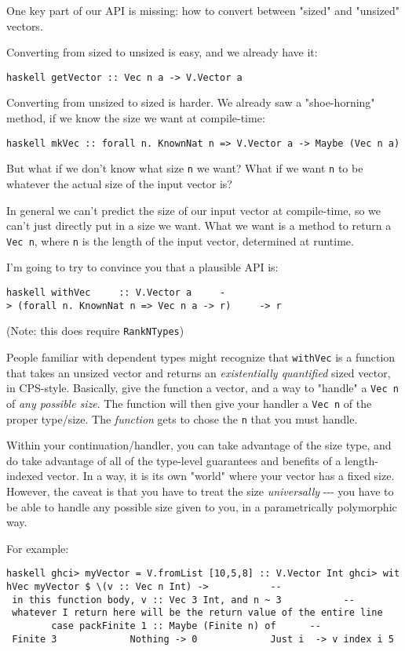 \documentclass[]{article}
\begin{document}
One key part of our API is missing: how to convert between "sized" and "unsized"
vectors.

Converting from sized to unsized is easy, and we already have it:

\texttt{haskell\ getVector\ ::\ Vec\ n\ a\ -\textgreater{}\ V.Vector\ a}

Converting from unsized to sized is harder. We already saw a "shoe-horning"
method, if we know the size we want at compile-time:

\texttt{haskell\ mkVec\ ::\ forall\ n.\ KnownNat\ n\ =\textgreater{}\ V.Vector\ a\ -\textgreater{}\ Maybe\ (Vec\ n\ a)}

But what if we don't know what size \texttt{n} we want? What if we want
\texttt{n} to be whatever the actual size of the input vector is?

In general we can't predict the size of our input vector at compile-time, so we
can't just directly put in a size we want. What we want is a method to return a
\texttt{Vec\ n}, where \texttt{n} is the length of the input vector, determined
at runtime.

I'm going to try to convince you that a plausible API is:

\texttt{haskell\ withVec\ \ \ \ \ ::\ V.Vector\ a\ \ \ \ \ -\textgreater{}\ (forall\ n.\ KnownNat\ n\ =\textgreater{}\ Vec\ n\ a\ -\textgreater{}\ r)\ \ \ \ \ -\textgreater{}\ r}

(Note: this does require \texttt{RankNTypes})

People familiar with dependent types might recognize that \texttt{withVec} is a
function that takes an unsized vector and returns an \emph{existentially
quantified} sized vector, in CPS-style. Basically, give the function a vector,
and a way to "handle" a \texttt{Vec\ n} of \emph{any possible size}. The
function will then give your handler a \texttt{Vec\ n} of the proper type/size.
The \emph{function} gets to chose the \texttt{n} that you must handle.

Within your continuation/handler, you can take advantage of the size type, and
do take advantage of all of the type-level guarantees and benefits of a
length-indexed vector. In a way, it is its own "world" where your vector has a
fixed size. However, the caveat is that you have to treat the size
\emph{universally} -\/-\/- you have to be able to handle any possible size given
to you, in a parametrically polymorphic way.

For example:

\texttt{haskell\ ghci\textgreater{}\ myVector\ =\ V.fromList\ {[}10,5,8{]}\ ::\ V.Vector\ Int\ ghci\textgreater{}\ withVec\ myVector\ \$\ \textbackslash{}(v\ ::\ Vec\ n\ Int)\ -\textgreater{}\ \ \ \ \ \ \ \ \ \ \ -\/-\ in\ this\ function\ body,\ \textasciigrave{}v\ ::\ Vec\ 3\ Int\textasciigrave{},\ and\ \textasciigrave{}n\ \textasciitilde{}\ 3\textasciigrave{}\ \ \ \ \ \ \ \ \ \ \ -\/-\ whatever\ I\ return\ here\ will\ be\ the\ return\ value\ of\ the\ entire\ line\ \ \ \ \ \ \ \ \ \ \ case\ packFinite\ 1\ ::\ Maybe\ (Finite\ n)\ of\ \ \ \ \ \ -\/-\ Finite\ 3\ \ \ \ \ \ \ \ \ \ \ \ \ Nothing\ -\textgreater{}\ 0\ \ \ \ \ \ \ \ \ \ \ \ \ Just\ i\ \ -\textgreater{}\ v\ \textasciigrave{}index\textasciigrave{}\ i\ 5}
\end{document}
